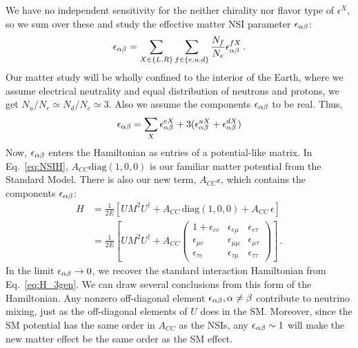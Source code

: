 We have no independent sensitivity for the neither chirality nor flavor type of $\epsilon^X$, so we sum over these and study the effective matter NSI parameter
 $\epsilon_{\alpha\beta}$:
\begin{align}
    \epsilon_{\alpha\beta} = \sum_{X \in \{L,R\}} \sum_{f \in \{e,u,d\}} \frac{N_f}{N_e} \epsilon^{fX}_{\alpha\beta}\,.
\end{align}
Our matter study will be wholly confined to the interior of the Earth, where we assume electrical neutrality and equal distribution of neutrons and protons, 
we get $N_u/N_e \simeq N_d/N_e \simeq 3$. Also we assume the components $\epsilon_{\alpha\beta}$ to be real. Thus,
\begin{align}
    \epsilon_{\alpha\beta} =  \sum_X \epsilon_{\alpha\beta}^{eX} + 3(\epsilon_{\alpha\beta}^{uX} + \epsilon_{\alpha\beta}^{dX})
\end{align}
Now, $\epsilon_{\alpha\beta}$ enters the Hamiltonian as entries of a potential-like matrix. In Eq.~\ref{eq:NSIH}, $A_{CC}\text{diag}(1,0,0)$ is our 
familiar matter potential from the Standard Model. There is also our new term, $A_{CC} \epsilon$, which contains the components $\epsilon_{\alpha\beta}$:
\begin{align}\label{eq:NSIH}
    H &= \frac{1}{2E} \left[UM^2U^\dagger + A_{CC}\,\text{diag}(1,0,0) + A_{CC}\, \epsilon \right] \nonumber \\
      &= \frac{1}{2E} \left[UM^2U^\dagger + A_{CC}
      \begin{pmatrix}
          1 + \epsilon_{ee} & \epsilon_{e\mu} & \epsilon_{e\tau}  \\
          \epsilon_{\mu e} & \epsilon_{\mu\mu} & \epsilon_{\mu\tau}  \\
          \epsilon_{\tau e} & \epsilon_{\tau\mu} & \epsilon_{\tau\tau}
      \end{pmatrix} \right]\,.
\end{align} 
In the limit $\epsilon_{\alpha\beta} \to 0$, we recover the standard interaction Hamiltonian from Eq.~\ref{eq:H_3gen}.
We can draw several conclusions from this form of the Hamiltonian. Any nonzero off-diagonal element $\epsilon_{\alpha\beta}, \alpha \neq \beta$ contribute
to neutrino mixing, just as the off-diagonal elements of $U$ does in the SM. Moreover, since the SM potential has the same order in $A_{CC}$ as the NSIs, 
any $\epsilon_{\alpha\beta} \sim 1$ will make the new matter effect be the same order as the SM effect.

